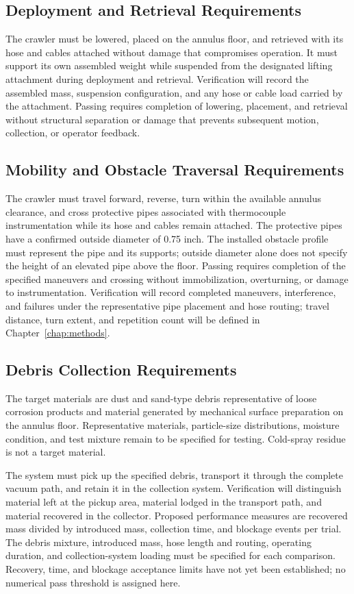 \subsection{Deployment and Retrieval Requirements}
\label{sec:deployment-requirements}
The crawler must be lowered, placed on the annulus floor, and retrieved with its hose and cables attached without damage that compromises operation. It must support its own assembled weight while suspended from the designated lifting attachment during deployment and retrieval. Verification will record the assembled mass, suspension configuration, and any hose or cable load carried by the attachment. Passing requires completion of lowering, placement, and retrieval without structural separation or damage that prevents subsequent motion, collection, or operator feedback.

\subsection{Mobility and Obstacle Traversal Requirements}
\label{sec:mobility-requirements}
The crawler must travel forward, reverse, turn within the available annulus clearance, and cross protective pipes associated with thermocouple instrumentation while its hose and cables remain attached. The protective pipes have a confirmed outside diameter of 0.75 inch. The installed obstacle profile must represent the pipe and its supports; outside diameter alone does not specify the height of an elevated pipe above the floor. Passing requires completion of the specified maneuvers and crossing without immobilization, overturning, or damage to instrumentation. Verification will record completed maneuvers, interference, and failures under the representative pipe placement and hose routing; travel distance, turn extent, and repetition count will be defined in Chapter~\ref{chap:methods}.

\subsection{Debris Collection Requirements}
\label{sec:collection-requirements}
The target materials are dust and sand-type debris representative of loose corrosion products and material generated by mechanical surface preparation on the annulus floor. Representative materials, particle-size distributions, moisture condition, and test mixture remain to be specified for testing. Cold-spray residue is not a target material.

The system must pick up the specified debris, transport it through the complete vacuum path, and retain it in the collection system. Verification will distinguish material left at the pickup area, material lodged in the transport path, and material recovered in the collector. Proposed performance measures are recovered mass divided by introduced mass, collection time, and blockage events per trial. The debris mixture, introduced mass, hose length and routing, operating duration, and collection-system loading must be specified for each comparison. Recovery, time, and blockage acceptance limits have not yet been established; no numerical pass threshold is assigned here.


